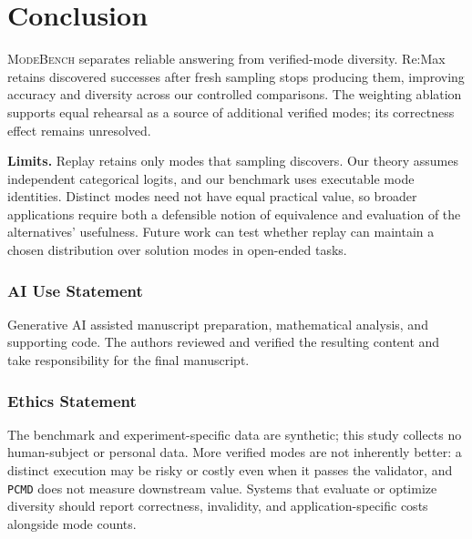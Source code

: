 \documentclass{article}
\newcommand{\1}{\mathbf 1}
\newcommand{\mb}{\textsc{ModeBench}}
\newcommand{\pmd}{\texttt{PCMD}}
\theoremstyle{remark}
\theoremstyle{definition}
\theoremstyle{plain}
\begin{document}
\section{Conclusion}
\label{sec:conclusion}
\label{sec:discussion}
\label{sec:limitations}

\mb{} separates reliable answering from verified-mode diversity. Re:Max retains discovered successes after fresh sampling stops producing them, improving accuracy and diversity across our controlled comparisons. The weighting ablation supports equal rehearsal as a source of additional verified modes; its correctness effect remains unresolved.

\textbf{Limits.} Replay retains only modes that sampling discovers. Our theory assumes independent categorical logits, and our benchmark uses executable mode identities. Distinct modes need not have equal practical value, so broader applications require both a defensible notion of equivalence and evaluation of the alternatives' usefulness. Future work can test whether replay can maintain a chosen distribution over solution modes in open-ended tasks.

\label{sec:main-end}
\clearpage
\subsubsection*{AI Use Statement}
\label{sec:ai-use}

Generative AI assisted manuscript preparation, mathematical analysis, and supporting code. The authors reviewed and verified the resulting content and take responsibility for the final manuscript.

\subsubsection*{Ethics Statement}

The benchmark and experiment-specific data are synthetic; this study collects
no human-subject or personal data. More verified modes are not inherently
better: a distinct execution may be risky or costly even when it passes the
validator, and \pmd{} does not measure downstream value. Systems
that evaluate or optimize diversity should report correctness, invalidity, and
application-specific costs alongside mode counts.
\end{document}
